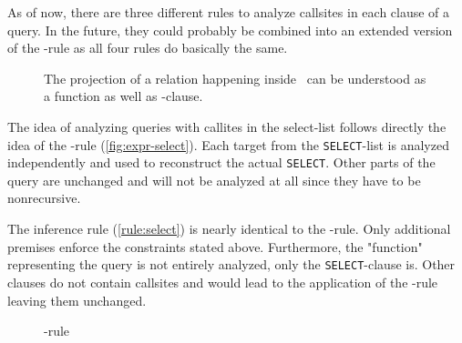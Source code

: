 As of now, there are three different rules to analyze callsites in each clause of a query. In the future, they could probably be combined into an extended version of the \REXPR-rule as all four rules do basically the same.

\begin{figure}[h!]
    \centering
    
    \caption{The projection of a relation happening inside \SELECT~can be understood as a function as well as \FROM-clause.}
    \label{fig:expr-select}
\end{figure}

The idea of analyzing queries with callites in the select-list follows directly the idea of the \REXPR-rule (\autoref{fig:expr-select}). Each target from the \texttt{SELECT}-list is analyzed independently and used to reconstruct the actual \texttt{SELECT}. Other parts of the query are unchanged and will not be analyzed at all since they have to be nonrecursive.

The inference rule (\autoref{rule:select}) is nearly identical to the \REXPR-rule. Only additional premises enforce the constraints stated above. Furthermore, the "function" representing the query is not entirely analyzed, only the \texttt{SELECT}-clause is. Other clauses do not contain callsites and would lead to the application of the \RBASE-rule leaving them unchanged.

\begin{figure}[h!]
    \centering\scriptsize
    \caption{\RSELECT-rule}
    \label{rule:select}
\end{figure}




